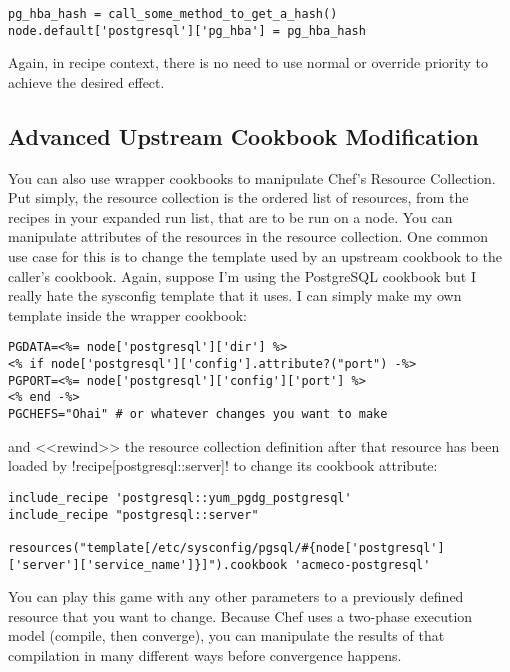 \begin{lstlisting}[label=lst:wrapper-cookbook5]
pg_hba_hash = call_some_method_to_get_a_hash()
node.default['postgresql']['pg_hba'] = pg_hba_hash
\end{lstlisting}

Again, in recipe context, there is no need to use normal or override priority to achieve the desired effect.


\subsection{Advanced Upstream Cookbook Modification}

You can also use wrapper cookbooks to manipulate Chef's Resource Collection. Put simply, the resource collection is the ordered list of resources, from the recipes in your expanded run list, that are to be run on a node. You can manipulate attributes of the resources in the resource collection. One common use case for this is to change the template used by an upstream cookbook to the caller's cookbook. Again, suppose I'm using the PostgreSQL cookbook but I really hate the sysconfig template that it uses. I can simply make my own template inside the wrapper cookbook:

\begin{lstlisting}[label=lst:wrapper-cookbook6,caption=acmeco-postgresql/templates/pgsql.sysconfig.erb]
PGDATA=<%= node['postgresql']['dir'] %>
<% if node['postgresql']['config'].attribute?("port") -%>
PGPORT=<%= node['postgresql']['config']['port'] %>
<% end -%>
PGCHEFS="Ohai" # or whatever changes you want to make
\end{lstlisting}

and <<rewind>> the resource collection definition after that resource has been loaded by \inline!recipe[postgresql::server]! to change its cookbook attribute:

\begin{lstlisting}[label=lst:wrapper-cookbook7,caption=acmeco-postgresql/recipes/default.rb]
include_recipe 'postgresql::yum_pgdg_postgresql'
include_recipe "postgresql::server"

resources("template[/etc/sysconfig/pgsql/#{node['postgresql']['server']['service_name']}]").cookbook 'acmeco-postgresql'
\end{lstlisting}

You can play this game with any other parameters to a previously defined resource that you want to change. Because Chef uses a two-phase execution model (compile, then converge), you can manipulate the results of that compilation in many different ways before convergence happens.

